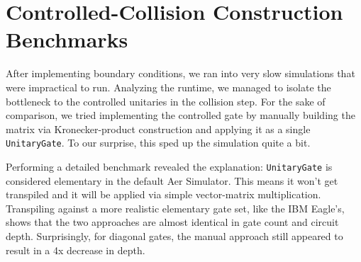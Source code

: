 \chapter{Controlled-Collision Construction Benchmarks}
\label{app:controlled_comparison}

After implementing boundary conditions, we ran into very slow simulations that were impractical to run.
Analyzing the runtime, we managed to isolate the bottleneck to the controlled unitaries in the collision step.
For the sake of comparison, we tried implementing the controlled gate by manually building the matrix via Kronecker-product construction and applying it as a single \texttt{UnitaryGate}.
To our surprise, this sped up the simulation quite a bit.

Performing a detailed benchmark revealed the explanation: \texttt{UnitaryGate} is considered elementary in the default Aer Simulator.
This means it won't get transpiled and it will be applied via simple vector-matrix multiplication.
Transpiling against a more realistic elementary gate set, like the IBM Eagle's, shows that the two approaches are almost identical in gate count and circuit depth.
Surprisingly, for diagonal gates, the manual approach still appeared to result in a 4x decrease in depth.

\begin{table}[H]
\centering
\caption{Gate count / depth transpilation comparison and runtime}
\label{tab:controlled_comparison}
\end{table}